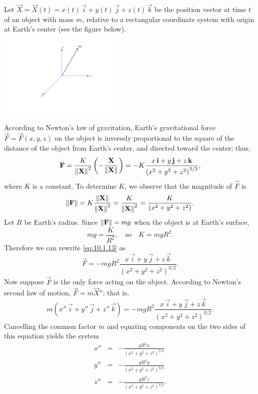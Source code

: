 \documentclass{ximera}
\begin{document}
\begin{example}\label{example:10.1.3}
Let $\vec{X}=\vec{X}(t)=x(t)\,\vec{i}+y(t)\,\vec{j}+z(t)\,\vec{k}$ be
the position vector at time $t$ of an object with mass $m$, relative
to a rectangular coordinate system with origin at Earth's center
(see the figure below). 

\begin{image}
 \includegraphics[height=1.5in]{fig100103.jpg} 
\end{image}

According to Newton's law of gravitation,
Earth's gravitational force $\vec{F}=\vec{F}(x,y,z)$ on the object is
inversely proportional to the square of the distance of the object
from Earth's center, and directed toward the center;   thus,
\begin{equation} \label{eq:10.1.13}
\mathbf{F}=\frac{K}{\left\lVert\mathbf{X}\right\rVert^2}\left(-\frac{\mathbf{X}}
{\left\lVert\mathbf{X}\right\rVert}\right)=-K\frac{x\,\mathbf{i}+y\,\mathbf{j}+z\,\mathbf{k}}{\left(x^2+y^2+z^2\right)^{3/2}},
\end{equation}
where $K$ is a constant.  To determine $K$,  we observe that the magnitude
of $\vec{F}$  is
$$
\left\lVert\mathbf{F}\right\rVert=K\frac{\left\lVert\mathbf{X}\right\rVert}{\left\lVert\mathbf{X}\right\rVert^3}=\frac{K}{\left\lVert\mathbf{X}\right\rVert^2}
=\frac{K}{(x^2+y^2+z^2)}.
$$
Let $R$  be Earth's radius.
Since $\left\lVert\mathbf{F}\right\rVert=mg$ when the object is at Earth's
surface,
$$
mg = \frac{K}{R^2},\quad\mbox{so}\quad K=mgR^2.
$$
Therefore we can rewrite \eqref{eq:10.1.13} as
$$
\vec{F}=-mgR^2\frac{x\,\vec{i}+y\,\vec{j}+z\,\vec{k}}{\left(x^2+y^2+z^2\right)^{3/2}}.
$$
Now suppose $\vec{F}$ is the only force acting on the object.
According to Newton's second law of motion, $\vec{F}=m\vec{X}''$;   that
is,
$$
 m(x''\,\vec{i}+y''\,\vec{j}+z''\,\vec{k})=
-mgR^2\frac{x\,\vec{i}+y\,\vec{j}+z\,\vec{k}}{\left(x^2+y^2+z^2\right)^{3/2}}.
$$
Cancelling the common factor $m$ and equating components on the two sides
of this equation yields the  system
\begin{equation} \label{eq:10.1.14}
\begin{array}{rcl}
 x''&=&-\frac{gR^2x}{(x^2+y^2+z^2)^{3/2}}\\
 y''&=&-\frac{gR^2y}{(x^2+y^2+z^2)^{3/2}}\\
 z''&=&-\frac{gR^2z}{(x^2+y^2+z^2)^{3/2}}.
\end{array}
\end{equation}
\end{example}
\end{document}
